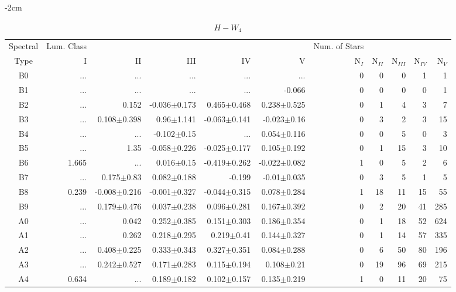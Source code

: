 \begin{table}[t]
\tiny
\centering
\caption{$H-W_{4}$}
\begin{center}
    \addtolength{\leftskip} {-2cm}
    \addtolength{\rightskip}{-2cm}
    \begin{tabular}{c|rrrrr|rrrrr}
    \toprule
    Spectral & Lum. Class & & & & & Num. of Stars & & & &  \\
    Type & I & II & III &  IV & V & N$_{I}$ & N$_{II}$ & N$_{III}$ & N$_{IV}$ & N$_{V}$ \\ \midrule
 
B0	&	 ...	&	 ...	&	 ...	&	 ...	&	 ...	&	0	&	0	&	0	&	1	&	1	\\
B1	&	 ...	&	 ...	&	 ...	&	 ...	&	-0.066	&	0	&	0	&	0	&	0	&	1	\\
B2	&	 ...	&	0.152	&	-0.036$\pm$0.173	&	0.465$\pm$0.468	&	0.238$\pm$0.525	&	0	&	1	&	4	&	3	&	7	\\
B3	&	 ...	&	0.108$\pm$0.398	&	0.96$\pm$1.141	&	-0.063$\pm$0.141	&	-0.023$\pm$0.16	&	0	&	3	&	2	&	3	&	15	\\
B4	&	 ...	&	 ...	&	-0.102$\pm$0.15	&	 ...	&	0.054$\pm$0.116	&	0	&	0	&	5	&	0	&	3	\\
B5	&	 ...	&	1.35	&	-0.058$\pm$0.226	&	-0.025$\pm$0.177	&	0.105$\pm$0.192	&	0	&	1	&	15	&	3	&	10	\\
B6	&	1.665	&	 ...	&	0.016$\pm$0.15	&	-0.419$\pm$0.262	&	-0.022$\pm$0.082	&	1	&	0	&	5	&	2	&	6	\\
B7	&	 ...	&	0.175$\pm$0.83	&	0.082$\pm$0.188	&	-0.199	&	-0.01$\pm$0.035	&	0	&	3	&	5	&	1	&	5	\\
B8	&	0.239	&	-0.008$\pm$0.216	&	-0.001$\pm$0.327	&	-0.044$\pm$0.315	&	0.078$\pm$0.284	&	1	&	18	&	11	&	15	&	55	\\
B9	&	 ...	&	0.179$\pm$0.476	&	0.037$\pm$0.238	&	0.096$\pm$0.281	&	0.167$\pm$0.392	&	0	&	2	&	20	&	41	&	285	\\
A0	&	 ...	&	0.042	&	0.252$\pm$0.385	&	0.151$\pm$0.303	&	0.186$\pm$0.354	&	0	&	1	&	18	&	52	&	624	\\
A1	&	 ...	&	0.262	&	0.218$\pm$0.295	&	0.219$\pm$0.41	&	0.144$\pm$0.327	&	0	&	1	&	14	&	57	&	335	\\
A2	&	 ...	&	0.408$\pm$0.225	&	0.333$\pm$0.343	&	0.327$\pm$0.351	&	0.084$\pm$0.288	&	0	&	6	&	50	&	80	&	196	\\
A3	&	 ...	&	0.242$\pm$0.527	&	0.171$\pm$0.283	&	0.115$\pm$0.194	&	0.108$\pm$0.21	&	0	&	19	&	96	&	69	&	215	\\
A4	&	0.634	&	 ...	&	0.189$\pm$0.182	&	0.102$\pm$0.157	&	0.135$\pm$0.219	&	1	&	0	&	11	&	20	&	75	\\

\end{tabular}
\end{center}
\end{table}

